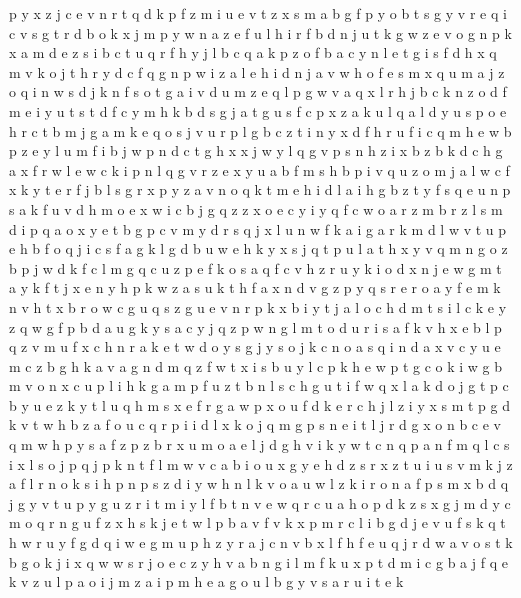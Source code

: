 \documentclass{article}
\begin{document}
p y x z j c e v n r t q d
k p f z m
i u e v t z x s m a b g f p y
o b t s g y v r e
q i c v s g t r d b o k x j m p y w n a z e f u l
h i r f b d n j u t k g w z e
v o g n p k x a m d e z s i b c t u q r f h y j l
b c q a k p
z o f b a c y n l e t g i s
f d h x q m
v k o j t h r y d c f q g n p w i z a l e
h i
d n j a v w h o f e s m x q
u m a j z o q i n w s d
j k n f s o t g a i v d u m z e q l
p g w v a q x l r h j b c k n z o d f m e i y u t s
t d f c y m h k b
d s g j
a t g u s f
c p x z a k u l
q a l d y u s p o e h r c t b m j g
a m k e q o s j v u r p l g b c z t i n y x d f h
r u f i c q m h e w b p
z e y l u m f i b j w p n d c t g h x
x j
w y l q g v p s n h z i x b
z b k d c h g a x f r w l e
w c k i p n l q g v r z e x y u a b f m s
h b p i v q u z o m j a l w c f x k y t e r
f j b l s g r x p y z a v n o q k t m e h i d
l a i h g b z t y f s q e u n
p s a k f u v d h m o e x w i c b j g q z
z x o e c y i
y q f c w o
a r z m
b r z l s m d i p q a o x y
e t b g p c v m y d r s q j x l u n w f k a i
g a r k m d l w v t u p e h b f o q j i c
s f a g
k
l g d b u w e h k y x s j q t p
u l a t h x y v q m n g o z b p j w d k f c
l m g q c u z p e f k o s a
q f c v h z r u y k i o d x n j e w g m t
a y k f t j x e
n y h p k w z a s
u k t h f a x n d v g z p y q s r e
r o
a y f e m k n v h t x b r o w c g u
q s z g u e v n r p k x b i y t j a l o c h d
m t s i l c k e y z q w g f p b d a u
g k y s a
c y j q z p w n g l m t o d u r i s a f k v h x e
b l p q z v m u f x c h n r a k e t w d o y s g j
y s o j k c n
o a
s q i n d a x v c y u e
m c z b g h k a
v a g n d m q z f w t x i s b u y l c p k h e
w p t g c o k
i w g b m v o n x c u p l
i h k g a m p f u z t b n l s
c h g u t i f w q x l a k d o j
g t
p c b y u e z
k y t l u q h m s x e f r g a
w p x
o u f d k e r c h j l z i y x s m t p g
d k v t w h b z a f o u c q r p i
i d l x k o j q m g p s n e
i t l j r d g x o n b c e v q m w h p y s a f z
p
z b r x u m o a e l j d g h v i k y w t c n q p
a n f m q l c s i x
l s o j p
q j p k n t f l m w v c a b i o u x g y e h d z s r
x z t u
i u s v m k j z a f l r n o
k s i h p n
p s z d i y w h n l k v o a u
w l z k i r o n a f p s m x b d q j g y v t u
p y g u z r i t
m
i y l f b t n v e w q r c u a h o p d k z s x g j m
d y c m o q r n g u f z x h s k j e t w l p b a v
f v k
x p m r c l i b g d j e v u f s k q t h w
r u y f g
d q i w e g m u p h z y r a j c n v b x l
f h
f e u q j r d w a v o s t k b g
o k j i x q w
w s r j o e c z y h v a b n g i l m f k u x p t d
m i c g b a j f q e k
v z u l p a o i j m
z a i p m
h e a g o u l
b g y v s a r u i t e k
\end{document}
